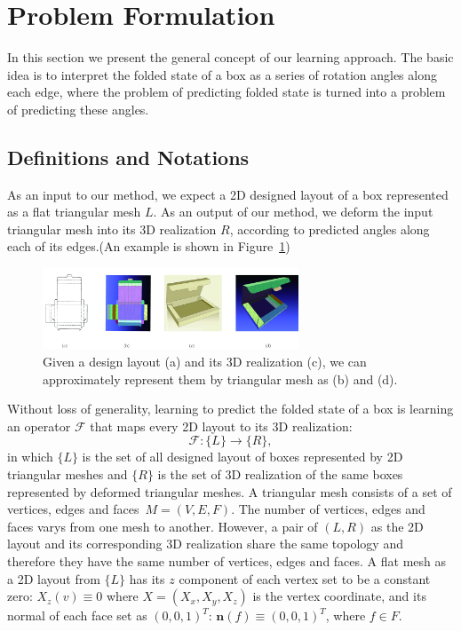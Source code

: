 \section{Problem Formulation}
In this section we present the general concept of our learning approach. The basic idea is to interpret the folded state of a box as a series of rotation angles along each edge, where the problem of predicting folded state is turned into a problem of predicting these angles. 
\subsection{Definitions and Notations}
As an input to our method, we expect a 2D designed layout of a box represented as a flat triangular mesh $L$. As an output of our method, we deform the input triangular mesh into its 3D realization $R$, according to predicted angles along each of its edges.(An example is shown in Figure~\ref{fig:approximation})\\
\begin{figure}
	\centering
	\includegraphics[width=3.0in]{images/approximation.jpg}
	\caption{Given a design layout (a) and its 3D realization (c), we can approximately represent them by triangular mesh as (b) and (d).}
	\label{fig:approximation}
\end{figure}
Without loss of generality, learning to predict the folded state of a box is learning an operator $\mathcal{F}$ that maps every 2D layout to its 3D realization:
\begin{equation}
\mathcal{F}:\{L\}\rightarrow\{R\},
\label{equ:F_0}
\end{equation}
in which $\{L\}$ is the set of all designed layout of boxes represented by 2D triangular meshes and $\{R\}$ is the set of 3D realization of the same boxes represented by deformed triangular meshes. A triangular mesh consists of a set of vertices, edges and faces~$M=(V,E,F)$. The number of vertices, edges and faces varys from one mesh to another. However, a pair of $(L,R)$ as the 2D layout and its corresponding 3D realization share the same topology and therefore they have the same number of vertices, edges and faces. A flat mesh as a 2D layout from $\{L\}$ has its $z$ component of each vertex set to be a constant zero: $X_z(v) \equiv 0$ where $X = (X_x,X_y,X_z)$ is the vertex coordinate, and its normal of each face set as $(0,0,1)^T$: $\mathbf{n}(f) \equiv (0,0,1)^T$, where $f \in F$.
